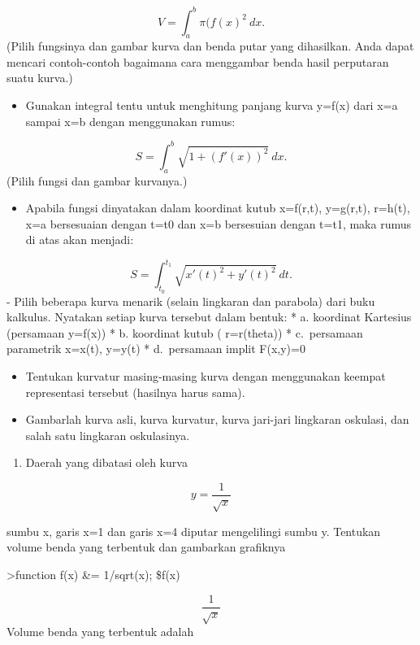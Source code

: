 \documentclass[
]{book}
\providecommand{\tightlist}{%
  \setlength{\itemsep}{0pt}\setlength{\parskip}{0pt}}
\begin{document}
\[V = \int_a^b \pi (f(x)^2\ dx.\](Pilih fungsinya dan gambar kurva dan benda putar yang dihasilkan. Anda dapat mencari contoh-contoh bagaimana cara menggambar benda hasil perputaran suatu kurva.)

\begin{itemize}
\tightlist
\item
  Gunakan integral tentu untuk menghitung panjang kurva y=f(x) dari x=a sampai x=b dengan menggunakan rumus:
\end{itemize}

\[S = \int_a^b \sqrt{1+(f'(x))^2} \ dx.\](Pilih fungsi dan gambar kurvanya.)

\begin{itemize}
\tightlist
\item
  Apabila fungsi dinyatakan dalam koordinat kutub x=f(r,t), y=g(r,t), r=h(t), x=a bersesuaian dengan t=t0 dan x=b bersesuian dengan t=t1, maka rumus di atas akan menjadi:
\end{itemize}

\[S=\int_{t_0}^{t_1} \sqrt{x'(t)^2+y'(t)^2}\ dt.\] - Pilih beberapa kurva menarik (selain lingkaran dan parabola) dari buku kalkulus. Nyatakan setiap kurva tersebut dalam bentuk: * a. koordinat Kartesius (persamaan y=f(x)) * b. koordinat kutub ( r=r(theta)) * c.~persamaan parametrik x=x(t), y=y(t) * d.~persamaan implit F(x,y)=0

\begin{itemize}
\tightlist
\item
  Tentukan kurvatur masing-masing kurva dengan menggunakan keempat representasi tersebut (hasilnya harus sama).
\item
  Gambarlah kurva asli, kurva kurvatur, kurva jari-jari lingkaran oskulasi, dan salah satu lingkaran oskulasinya.
\end{itemize}

\begin{enumerate}
\def\labelenumi{\arabic{enumi}.}
\tightlist
\item
  Daerah yang dibatasi oleh kurva
\end{enumerate}

\[y= \frac {1}{\sqrt x}\]

sumbu x, garis x=1 dan garis x=4 diputar mengelilingi sumbu y. Tentukan volume benda yang terbentuk dan gambarkan grafiknya

\textgreater function f(x) \&= 1/sqrt(x); \$f(x)

\[\frac{1}{\sqrt{x}}\]Volume benda yang terbentuk adalah
\end{document}
